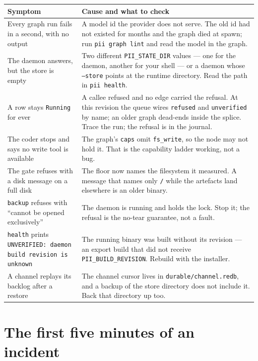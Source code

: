 \begin{longtable}{@{}p{}p{}@{}}
	\toprule
	\textbf{Symptom} & \textbf{Cause and what to check} \\
	\midrule
	\endhead
	Every graph run fails in a second, with no output &
	A model id the provider does not serve. The old id had not existed for months and the
	graph died at spawn; run \texttt{pii graph lint} and read the model in the graph. \\
	The daemon answers, but the store is empty & Two different \texttt{PII\_STATE\_DIR}
	values --- one for the daemon, another for your shell --- or a daemon whose
	\texttt{--store} points at the runtime directory. Read the path in \texttt{pii health}. \\
	A row stays \texttt{Running} for ever & A callee refused and no edge carried the
	refusal. At this revision the queue wires \texttt{refused} and \texttt{unverified} by
	name; an older graph dead-ends inside the splice. Trace the run; the refusal is in the
	journal. \\
	The coder stops and says no write tool is available & The graph's \texttt{caps} omit
	\texttt{fs\_write}, so the node may not hold it. That is the capability ladder working,
	not a bug. \\
	The gate refuses with a disk message on a full disk & The floor now names the filesystem
	it measured. A message that names only \texttt{/} while the artefacts land elsewhere is
	an older binary. \\
	\texttt{backup} refuses with \enquote{cannot be opened exclusively} & The daemon is
	running and holds the lock. Stop it; the refusal is the no-tear guarantee, not a fault. \\
	\texttt{health} prints \texttt{UNVERIFIED: daemon build revision is unknown} & The
	running binary was built without its revision --- an export build that did not receive
	\texttt{PII\_BUILD\_REVISION}. Rebuild with the installer. \\
	A channel replays its backlog after a restore & The channel cursor lives in
	\texttt{durable/channel.redb}, and a backup of the store directory does not include it.
	Back that directory up too. \\
	\bottomrule
\end{longtable}

\section{The first five minutes of an incident}

